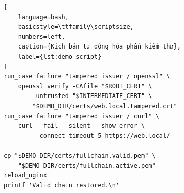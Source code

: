 \documentclass[11pt,a4paper]{article}
\begin{document}
\begin{lstlisting}[
    language=bash,
    basicstyle=\ttfamily\scriptsize,
    numbers=left,
    caption={Kịch bản tự động hóa phần kiểm thử},
    label={lst:demo-script}
]
run_case failure "tampered issuer / openssl" \
    openssl verify -CAfile "$ROOT_CERT" \
        -untrusted "$INTERMEDIATE_CERT" \
        "$DEMO_DIR/certs/web.local.tampered.crt"
run_case failure "tampered issuer / curl" \
    curl --fail --silent --show-error \
        --connect-timeout 5 https://web.local/

cp "$DEMO_DIR/certs/fullchain.valid.pem" \
    "$DEMO_DIR/certs/fullchain.active.pem"
reload_nginx
printf 'Valid chain restored.\n'
\end{lstlisting}
\end{document}
